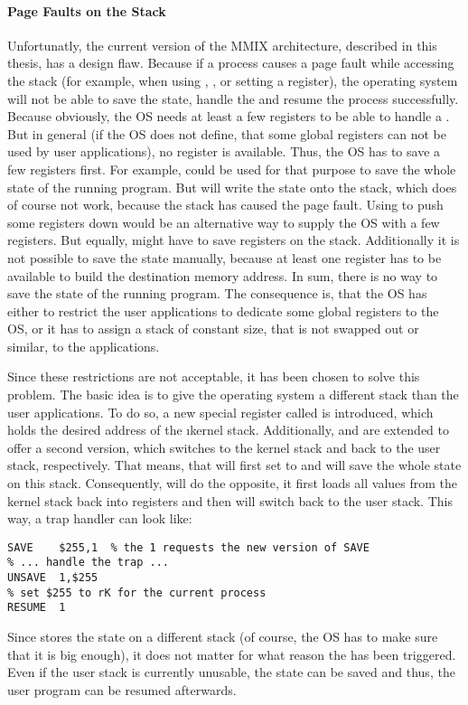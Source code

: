 \paragraph{Page Faults on the Stack}

Unfortunatly, the current version of the MMIX architecture, described in this thesis, has a design flaw. Because if a process causes a page fault while accessing the stack (for example, when using , ,  or setting a register), the operating system will not be able to save the state, handle the  and resume the process successfully. Because obviously, the OS needs at least a few registers to be able to handle a . But in general (\ie if the OS does not define, that some global registers can not be used by user applications), no register is available. Thus, the OS has to save a few registers first. For example,  could be used for that purpose to save the whole state of the running program. But  will write the state onto the stack, which does of course not work, because the stack has caused the page fault. Using  to push some registers down would be an alternative way to supply the OS with a few registers. But equally,  might have to save registers on the stack. Additionally it is not possible to save the state manually, because at least one register has to be available to build the destination memory address. In sum, there is no way to save the state of the running program. The consequence is, that the OS has either to restrict the user applications to dedicate some global registers to the OS, or it has to assign a stack of constant size, that is not swapped out or similar, to the applications.

Since these restrictions are not acceptable, it has been chosen to solve this problem. The basic idea is to give the operating system a different stack than the user applications. To do so, a new special register called  is introduced, which holds the desired address of the \i{kernel stack}. Additionally,  and  are extended to offer a second version, which switches to the kernel stack and back to the user stack, respectively. That means, that  will first set  to  and will save the whole state on this stack. Consequently,  will do the opposite, \ie it first loads all values from the kernel stack back into registers and then will switch back to the user stack. This way, a trap handler can look like:
\begin{lstlisting}[language=mmixal,caption={Trap handler, using the extended {\tt SAVE} and {\tt UNSAVE}}]
SAVE	$255,1	% the 1 requests the new version of SAVE
% ... handle the trap ...
UNSAVE	1,$255
% set $255 to rK for the current process
RESUME	1
\end{lstlisting}
Since  stores the state on a different stack (of course, the OS has to make sure that it is big enough), it does not matter for what reason the  has been triggered. Even if the user stack is currently unusable, the state can be saved and thus, the user program can be resumed afterwards.

